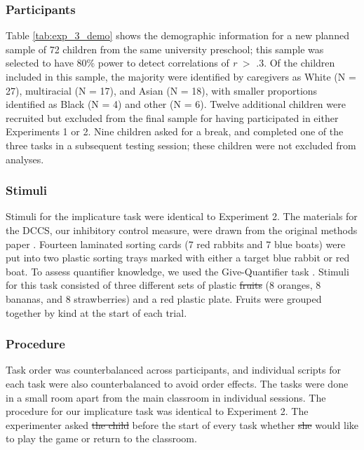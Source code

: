 \documentclass[man]{apa2}
\providecommand{\DIFadd}[1]{{\protect\color{blue}\uwave{#1}}} %
\providecommand{\DIFdel}[1]{{\protect\color{red}\sout{#1}}}                      %
\providecommand{\DIFaddbegin}{} %
\providecommand{\DIFaddend}{} %
\providecommand{\DIFdelbegin}{} %
\providecommand{\DIFdelend}{} %
\begin{document}
\subsubsection{Participants}

Table \ref{tab:exp_3_demo} shows the demographic information for a new planned sample of 72 children from the same university preschool; this sample was selected to have 80\% power to detect correlations of \emph{r} $>$ .3. Of the children included in this sample, the majority were identified by caregivers as White (N = 27), multiracial (N = 17), and Asian (N = 18), with smaller proportions identified as Black (N = 4) and other (N = 6). Twelve additional children were recruited but excluded from the final sample for having participated in either Experiments 1 or 2. Nine children asked for a break, and completed one of the three tasks in a subsequent testing session; these children were not excluded from analyses.

\DIFdelbegin %

\DIFdelend \subsubsection{Stimuli} Stimuli for the implicature task were identical to Experiment 2. The materials for the DCCS, our inhibitory control measure, were drawn from the original methods paper \cite{zelazo2006}. Fourteen laminated sorting cards (7 red rabbits and 7 blue boats) were put into two plastic sorting trays marked with either a target blue rabbit or red boat. To assess quantifier knowledge, we used the Give-Quantifier task \cite{barner2009}. Stimuli for this task consisted of three different sets of plastic \DIFdelbegin \DIFdel{fruits }\DIFdelend \DIFaddbegin \DIFadd{fruit }\DIFaddend (8 oranges, 8 bananas, and 8 strawberries) and a red plastic plate. Fruits were grouped together by kind at the start of each trial.

\subsubsection{Procedure}
Task order was counterbalanced across participants, and individual scripts for each task were also counterbalanced to avoid order effects. The tasks were done in a small room apart from the main classroom in individual sessions. The procedure for our implicature task was identical to Experiment 2. The experimenter asked \DIFdelbegin \DIFdel{the child }\DIFdelend \DIFaddbegin \DIFadd{children }\DIFaddend before the start of every task whether \DIFdelbegin \DIFdel{she }\DIFdelend \DIFaddbegin \DIFadd{they }\DIFaddend would like to play the game or return to the classroom.
\end{document}
